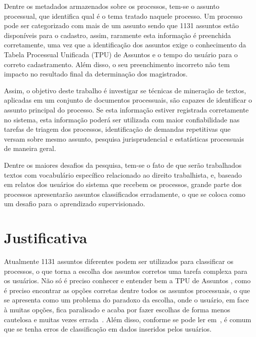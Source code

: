 Dentre os metadados armazenados sobre os processos, tem-se o assunto processual, que identifica qual é o tema tratado naquele processo. Um processo pode ser categorizado com mais de um assunto sendo que 1131 assuntos estão disponíveis para o cadastro, assim, raramente esta informação é preenchida corretamente, uma vez que a identificação dos assuntos exige o conhecimento da Tabela Processual Unificada (TPU) de Assuntos \cite{tputst} e o tempo do usuário para o correto cadastramento. Além disso, o seu preenchimento incorreto não tem impacto no resultado final da determinação dos magistrados. 

Assim, o objetivo deste trabalho é investigar se técnicas de mineração de textos, aplicadas em um conjunto de documentos processuais, são capazes de identificar o assunto principal do processo. Se esta informação estiver registrada corretamente no sistema, esta informação poderá ser utilizada com maior confiabilidade nas tarefas de triagem dos processos, identificação de demandas repetitivas que versam sobre mesmo assunto, pesquisa jurisprudencial e estatísticas processuais de maneira geral. 

Dentre os maiores desafios da pesquisa, tem-se o fato de que serão trabalhados textos com vocabulário específico relacionado ao direito trabalhista, e, baseado em relatos dos usuários do sistema que recebem os processos, grande parte dos processos apresentarão assuntos classificados erradamente, o que se coloca como um desafio para o aprendizado supervisionado. 

\section{Justificativa}%
Atualmente 1131 assuntos diferentes podem ser utilizados para classificar os processos, o que torna a escolha dos assuntos corretos uma tarefa complexa para os usuários. 
Não só é preciso conhecer e entender bem a TPU de Assuntos \cite{tputst}, como é preciso encontrar as opções corretas dentre todos os assuntos processuais, o que se apresenta como um problema do paradoxo da escolha, onde o usuário, em face à muitas opções, fica paralisado e acaba por fazer escolhas de forma menos cautelosa e muitas vezes errada~\cite{paradoxofchoice}. Além  disso, conforme se pode ler em~\cite{mislabeled_survey}, é comum que se tenha erros de classificação em dados inseridos pelos usuários. 

